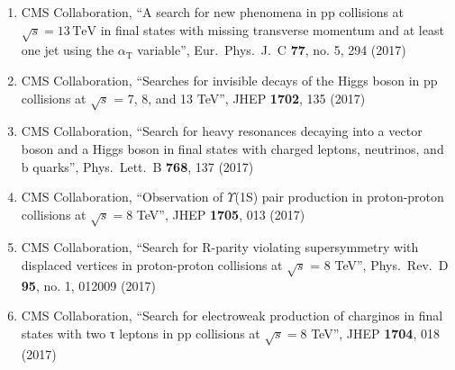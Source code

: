 \begin{enumerate}
\item CMS Collaboration, ``A search for new phenomena in pp collisions at $\sqrt{s} = 13\,\text {TeV} $ in final states with missing transverse momentum and at least one jet using the $\alpha _{\mathrm {T}}$ variable'', Eur.\ Phys.\ J.\ C {\bf 77}, no. 5, 294 (2017)

\item CMS Collaboration, ``Searches for invisible decays of the Higgs boson in pp collisions at $\sqrt{s}$ = 7, 8, and 13 TeV'', JHEP {\bf 1702}, 135 (2017)

\item CMS Collaboration, ``Search for heavy resonances decaying into a vector boson and a Higgs boson in final states with charged leptons, neutrinos, and b quarks'', Phys.\ Lett.\ B {\bf 768}, 137 (2017)

\item CMS Collaboration, ``Observation of $\Upsilon$(1S) pair production in proton-proton collisions at $ \sqrt{s}=8 $ TeV'', JHEP {\bf 1705}, 013 (2017)

\item CMS Collaboration, ``Search for R-parity violating supersymmetry with displaced vertices in proton-proton collisions at $\sqrt{s}$ = 8 TeV'', Phys.\ Rev.\ D {\bf 95}, no. 1, 012009 (2017)

\item CMS Collaboration, ``Search for electroweak production of charginos in final states with two τ leptons in pp collisions at $ \sqrt{s}=8 $ TeV'', JHEP {\bf 1704}, 018 (2017)


\end{enumerate}
